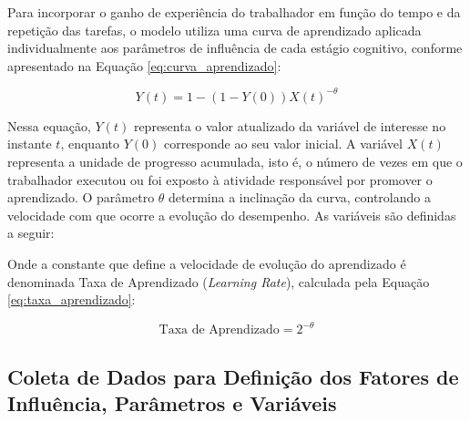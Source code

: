 
Para incorporar o ganho de experiência do trabalhador em função do tempo e da repetição das tarefas, o modelo utiliza uma curva de aprendizado aplicada individualmente aos parâmetros de influência de cada estágio cognitivo, conforme apresentado na Equação \ref{eq:curva_aprendizado}:

\begin{equation}
	Y(t) = 1 - (1 - Y(0)) X(t)^{-\theta}
	\label{eq:curva_aprendizado}
\end{equation}

Nessa equação, $Y(t)$ representa o valor atualizado da variável de interesse no instante $t$, enquanto $Y(0)$ corresponde ao seu valor inicial. A variável $X(t)$ representa a unidade de progresso acumulada, isto é, o número de vezes em que o trabalhador executou ou foi exposto à atividade responsável por promover o aprendizado. O parâmetro $\theta$ determina a inclinação da curva, controlando a velocidade com que ocorre a evolução do desempenho. As variáveis são definidas a seguir:


Onde a constante que define a velocidade de evolução do aprendizado é denominada Taxa de Aprendizado (\textit{Learning Rate}), calculada pela Equação \ref{eq:taxa_aprendizado}:

\begin{equation}
	\text{Taxa de Aprendizado} = 2^{-\theta}
	\label{eq:taxa_aprendizado}
\end{equation}
\subsection{Coleta de Dados para Definição dos Fatores de Influência, Parâmetros e Variáveis}

